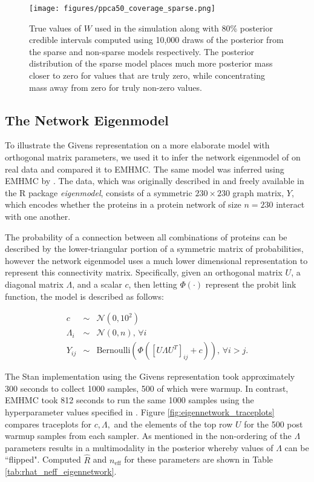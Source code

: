 \documentclass[ba]{imsart}
\numberwithin{equation}{section}
\theoremstyle{plain}
\begin{document}
\begin{figure}[h]
\centering
\vspace{.1in}
\texttt{[image: figures/ppca50\_coverage\_sparse.png]}
\vspace{.05in}
\caption{True values of $W$ used in the simulation along with 80\% posterior credible intervals computed using 10,000 draws of the posterior from the sparse and non-sparse models respectively. The posterior distribution of the sparse model places much more posterior mass closer to zero for values that are truly zero, while concentrating mass away from zero for truly non-zero values.}
\label{fig:ppca50_coverage_sparse}
\end{figure}

\subsection{The Network Eigenmodel}
To illustrate the Givens representation on a more elaborate model with orthogonal matrix parameters, we used it to infer the network eigenmodel of \cite{hoff2009simulation} on real data and compared it to EMHMC. The same model was inferred using EMHMC by \cite{byrne2013geodesic}. The data, which was originally described in \cite{butland2005interaction} and freely available in the R package \textit{eigenmodel}, consists of a symmetric $230 \times 230$ graph matrix, $Y$, which encodes whether the proteins in a protein network of size $n=230$ interact with one another.

\noindent The probability of a connection between all combinations of proteins can be described by the lower-triangular portion of a symmetric matrix of probabilities, however the network eigenmodel uses a much lower dimensional representation to represent this connectivity matrix. Specifically, given an orthogonal matrix $U$, a diagonal matrix $\Lambda$, and a scalar $c$, then letting $\Phi(\cdot)$ represent the probit link function, the model is described as follows:

\begin{eqnarray}
c &\sim& \mathcal{N}(0, 10^2)\\
\Lambda_i &\sim& \mathcal{N}(0, n),\, \forall i\\
Y_{ij} &\sim& \mathrm{Bernoulli} \left(\Phi ([U \Lambda U^T]_{ij} + c) \right),\, \forall i > j.
\end{eqnarray}

\noindent The Stan implementation using the Givens representation took approximately 300 seconds to collect 1000 samples, 500 of which were warmup. In contrast, EMHMC took 812 seconds to run the same 1000 samples using the hyperparameter values specified in  \cite{byrne2013geodesic}. Figure \ref{fig:eigennetwork_traceplots} compares traceplots for $c, \Lambda,$ and the elements of the top row $U$ for the 500 post warmup samples from each sampler. As mentioned in \cite{byrne2013geodesic} the non-ordering of the $\Lambda$ parameters results in a multimodality in the posterior whereby values of $\Lambda$ can be ``flipped". Computed $\hat{R}$ and $n_{\mathrm{eff}}$ for these parameters are shown in Table \ref{tab:rhat_neff_eigennetwork}.
\end{document}
